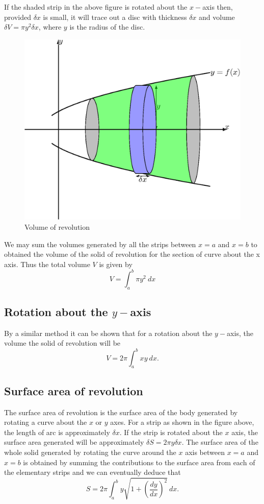 \documentclass[
  11pt,
  oneside]{book}
\newcommand{\slide}{}
\theoremstyle{definition}
\theoremstyle{definition}
\theoremstyle{definition}
\theoremstyle{definition}
\theoremstyle{remark}
\begin{document}
If the shaded strip in the above figure is rotated about the \(x-\)axis then, provided \(\delta x\) is small, it will trace out a disc with thickness \(\delta x\) and volume \(\delta V = \pi y^2\delta x\), where \(y\) is the radius of the disc.
\slide

\begin{figure}

{\centering \includegraphics[width=0.4\linewidth]{tikztopng-figure41} 

}

\caption{Volume of revolution}\label{fig:unnamed-chunk-71}
\end{figure}

We may sum the volumes generated by all the strips between \(x = a\) and \(x = b\) to obtained the volume of the solid of revolution for the section of curve about the x axis.
Thus the total volume \(V\) is given by
\[
V = \int_a^b\pi y^2\ dx
\]
\slide

\subsection{\texorpdfstring{Rotation about the \(y-\)axis}{Rotation about the y-axis}}\label{rotation-about-the-y-axis}

By a similar method it can be shown that for a rotation about the \(y-\)axis, the volume the solid of revolution will be
\[
V = 2\pi\int_a^bxy\ dx.
\]
\slide

\subsection{Surface area of revolution}\label{surface-area-of-revolution}

The surface area of revolution is the surface area of the body generated by rotating a curve about the \(x\) or \(y\) axes. For a strip as shown in the figure above, the length of arc is approximately \(\delta x\). If the strip is rotated about the \(x\) axis, the surface area generated will be approximately \(\delta S = 2\pi y\delta x\). The surface area of the whole solid generated by rotating the curve around the \(x\) axis between \(x = a\) and \(x = b\) is obtained by summing the contributions to the surface area from each of the elementary strips and we can eventually deduce that
\[
S = 2\pi\int_a^b y\sqrt{1+\left(\frac{dy}{dx}\right)^2}\ dx.
\]
\slide
\end{document}
